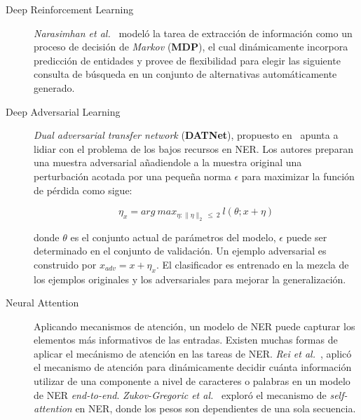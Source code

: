 \begin{description}
	\item[Deep Reinforcement Learning] \emph{Narasimhan et al.}~\cite{narasimhan2016improving} model\'o la tarea de extracci\'on de informaci\'on como un proceso de decisi\'on de \emph{Markov} (\textbf{MDP}), el cual din\'amicamente incorpora predicci\'on de entidades y provee de flexibilidad para elegir las siguiente consulta de b\'usqueda en un conjunto de alternativas autom\'aticamente generado.
	
	\item[Deep Adversarial Learning] \emph{Dual adversarial transfer network} (\textbf{DATNet}), propuesto en~\cite{zhou2018datnet} apunta a lidiar con el problema de los bajos recursos en NER. Los autores preparan una muestra adversarial a\~nadiendole a la muestra original una perturbaci\'on acotada por una peque\~na norma $\epsilon$ para maximizar la funci\'on de p\'erdida como sigue:
	
	\begin{equation}
	\eta_x = arg \ max_{\eta:\lVert \eta \rVert_2 \ \leq \ 2 } \ l(\theta; x + \eta)
	\end{equation}
	
	donde $\theta$ es el conjunto actual de par\'ametros del modelo, $\epsilon$ puede ser determinado en el conjunto de validaci\'on. Un ejemplo adversarial es construido por $x_{adv} = x + \eta_x$. El clasificador es entrenado en la mezcla de los ejemplos originales y los adversariales para mejorar la generalizaci\'on.
	
	\item[Neural Attention] Aplicando mecanismos de atenci\'on, un modelo de NER puede capturar los elementos m\'as informativos de las entradas. Existen muchas formas de aplicar el mec\'anismo de atenci\'on en las tareas de NER. \emph{Rei et al.}~\cite{rei2016attending}, aplic\'o el mecanismo de atenci\'on para din\'amicamente decidir cu\'anta informaci\'on utilizar de una componente a nivel de caracteres o palabras en un modelo de NER \emph{end-to-end}. \emph{Zukov-Gregoric et al.}~\cite{zukov2017neural} explor\'o el mecanismo de \emph{self-attention} en NER, donde los pesos son dependientes de una sola secuencia.
\end{description}







